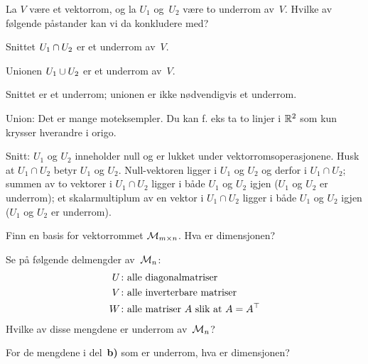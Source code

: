 \begin{oppgave}
La $V$ være et vektorrom, og la $U_1$ og~$U_2$ være to underrom
av~$V$.  Hvilke av følgende påstander kan vi da konkludere med?
\begin{punkt}
Snittet $U_1 \cap U_2$ er et underrom av~$V$.
\end{punkt}
\begin{punkt}
Unionen $U_1 \cup U_2$ er et underrom av~$V$.
\end{punkt}
\end{oppgave}

\begin{losning}
Snittet er et underrom; unionen er ikke nødvendigvis et underrom.


\noindent
Union: Det er mange moteksempler. Du kan f. eks ta to linjer i $\mathbb{R}^2$ som kun krysser hverandre i origo.

\noindent
Snitt: $U_1$ og $U_2$ inneholder null og er lukket under vektorromsoperasjonene. Husk at $U_1 \cap U_2$ betyr $U_1$ og $U_2$. Null-vektoren ligger i $U_1$ og $U_2$ og derfor i $U_1\cap U_2$; summen av to vektorer i $U_1\cap U_2$ ligger i både $U_1$ og $U_2$ igjen ($U_1$ og $U_2$ er underrom); et skalarmultiplum av en vektor i $U_1\cap U_2$ ligger i både $U_1$ og $U_2$ igjen ($U_1$ og $U_2$ er underrom).
\end{losning}


\begin{oppgave}

\begin{punkt}
Finn en basis for vektorrommet $\mathcal{M}_{m \times n}$.  Hva er dimensjonen?
\end{punkt}

\begin{punkt}
Se på følgende delmengder av~$\mathcal{M}_n$:
\begin{align*}
U \colon &\text{alle diagonalmatriser} \\
V \colon &\text{alle inverterbare matriser} \\
W \colon &\text{alle matriser~$A$ slik at $A = A^\top$}
\end{align*}
Hvilke av disse mengdene er underrom av~$\mathcal{M}_n$?
\end{punkt}

\begin{punkt}
For de mengdene i del~\textbf{b)} som er underrom, hva er dimensjonen?
\end{punkt}
\end{oppgave}

